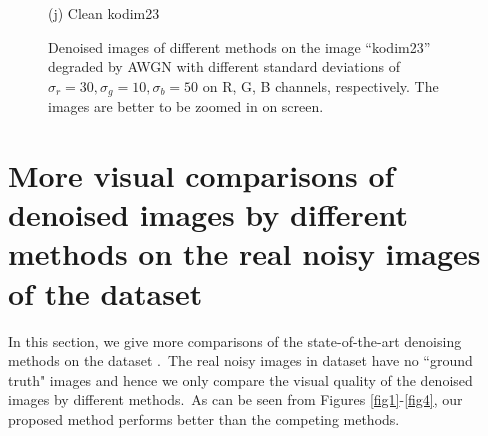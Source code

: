\documentclass[10pt,onecolumn,letterpaper]{article}
\begin{document}
\begin{figure}
{\begin{minipage}[t]{0.195\textwidth}
{\footnotesize (j) Clean kodim23}
\end{minipage}
}
\caption{Denoised images of different methods on the image ``kodim23'' degraded by AWGN with different standard deviations of $\sigma_{r}=30, \sigma_{g}=10, \sigma_{b}=50$ on R, G, B channels, respectively. The images are better to be zoomed in on screen.}
\label{f1}
\vspace{2mm}
\end{figure}

\section{More visual comparisons of denoised images by different methods on the real noisy images of the dataset \cite{ncwebsite}}

In this section, we give more comparisons of the state-of-the-art denoising methods on the dataset \cite{ncwebsite}.\ The real noisy images in dataset \cite{ncwebsite} have no ``ground truth" images and hence we only compare the visual quality of the denoised images by different methods.\ As can be seen from Figures \ref{fig1}-\ref{fig4}, our proposed method performs better than the competing methods.
\end{document}
